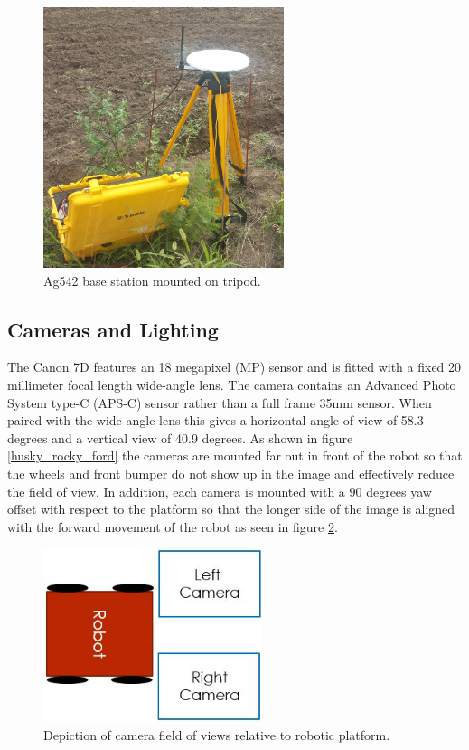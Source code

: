 \begin{figure}[htb]
	\centering
    \includegraphics[height=3in]{figures/sunflower_base_cropped.jpg}
    \caption[Base station with tripod]{Ag542 base station mounted on tripod.}
    \label{base_station}
\end{figure}

\subsection{Cameras and Lighting}

The Canon 7D features an 18 megapixel (MP) sensor and is fitted with a fixed 20 millimeter focal length wide-angle lens.  The camera contains an Advanced Photo System type-C (APS-C) sensor rather than a full frame 35mm sensor. When paired with the wide-angle lens this gives a horizontal angle of view of 58.3 degrees and a vertical view of 40.9 degrees.  
As shown in figure \ref{husky_rocky_ford} the cameras are mounted far out in front of the robot so that the wheels and front bumper do not show up in the image and effectively reduce the field of view.  In addition, each camera is mounted with a 90 degrees yaw offset with respect to the platform so that the longer side of the image is aligned with the forward movement of the robot as seen in figure \ref{figure:image_fov}.  

\begin{figure}[htb]
	\centering
    \includegraphics[height=2in]{figures/camera_directions.jpg}
    \caption[Camera field of view]{Depiction of camera field of views relative to robotic platform.}
    \label{figure:image_fov}
\end{figure}

